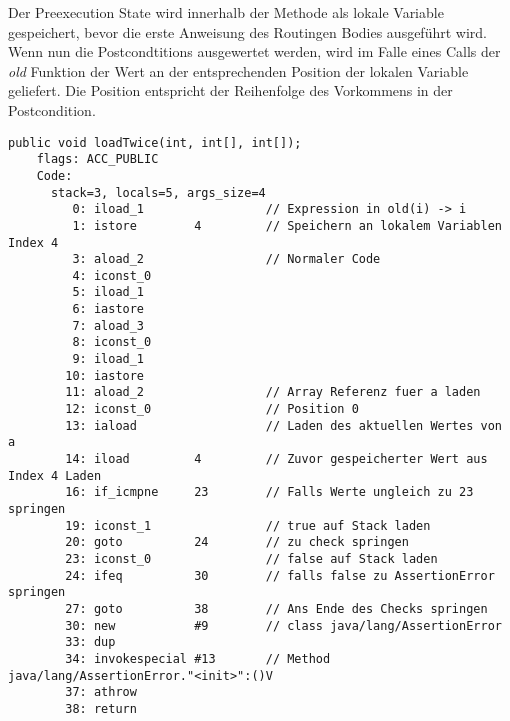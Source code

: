 Der Preexecution State wird innerhalb der Methode als lokale Variable gespeichert, bevor die erste Anweisung 
des Routingen Bodies ausgeführt wird.  Wenn nun 
die Postcondtitions ausgewertet werden, wird im Falle eines Calls der \textit{old} Funktion der Wert 
an der entsprechenden Position der lokalen Variable geliefert. Die Position entspricht der Reihenfolge 
des Vorkommens in der Postcondition.
\newline
\begin{lstlisting}[caption=Bytecode der loadTwice Prozedur mit postcondition mit Zugriff auf old State. Damit der Code etwas übersichtlicher ist\, wurde nur die erste Postcondtition kompiliert.,label={lst:loadtwice_code_old}]
public void loadTwice(int, int[], int[]);
    flags: ACC_PUBLIC
    Code:
      stack=3, locals=5, args_size=4
         0: iload_1                 // Expression in old(i) -> i 
         1: istore        4         // Speichern an lokalem Variablen Index 4
         3: aload_2                 // Normaler Code
         4: iconst_0      
         5: iload_1       
         6: iastore       
         7: aload_3       
         8: iconst_0      
         9: iload_1       
        10: iastore       
        11: aload_2                 // Array Referenz fuer a laden
        12: iconst_0                // Position 0
        13: iaload                  // Laden des aktuellen Wertes von a
        14: iload         4         // Zuvor gespeicherter Wert aus Index 4 Laden
        16: if_icmpne     23        // Falls Werte ungleich zu 23 springen
        19: iconst_1                // true auf Stack laden
        20: goto          24        // zu check springen
        23: iconst_0                // false auf Stack laden
        24: ifeq          30        // falls false zu AssertionError springen
        27: goto          38        // Ans Ende des Checks springen
        30: new           #9        // class java/lang/AssertionError
        33: dup           
        34: invokespecial #13       // Method java/lang/AssertionError."<init>":()V
        37: athrow        
        38: return
\end{lstlisting}


